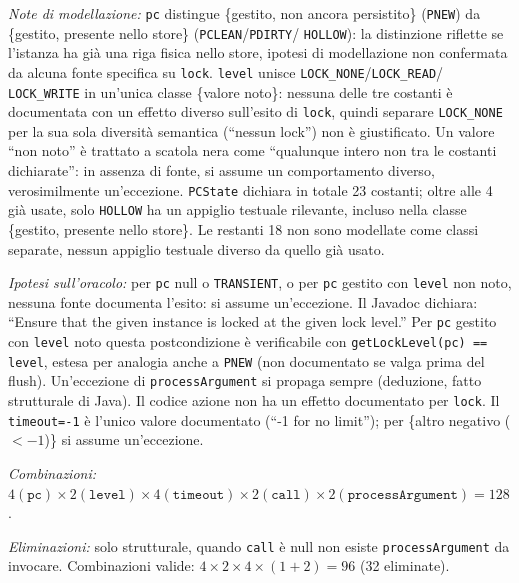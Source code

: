 \textit{Note di modellazione:} \texttt{pc} distingue \{gestito, non ancora persistito\}
(\texttt{PNEW}) da \{gestito, presente nello store\} (\texttt{PCLEAN}/\texttt{PDIRTY}/
\texttt{HOLLOW}): la distinzione riflette se l'istanza ha già una riga fisica nello store,
ipotesi di modellazione non confermata da alcuna fonte specifica su \texttt{lock}.
\texttt{level} unisce \texttt{LOCK\_NONE}/\texttt{LOCK\_READ}/
\texttt{LOCK\_WRITE} in un'unica classe \{valore noto\}: nessuna delle tre costanti è
documentata con un effetto diverso sull'esito di \texttt{lock}, quindi separare
\texttt{LOCK\_NONE} per la sua sola diversità semantica (``nessun lock'') non è giustificato.
Un valore ``non noto'' è trattato a scatola nera come ``qualunque intero non tra le costanti
dichiarate'': in assenza di fonte, si assume un comportamento diverso, verosimilmente
un'eccezione. \texttt{PCState} dichiara in totale 23 costanti; oltre alle 4 già usate, solo
\texttt{HOLLOW} ha un appiglio testuale rilevante, incluso nella classe \{gestito, presente
nello store\}. Le restanti 18 non sono modellate come classi separate, nessun appiglio testuale
diverso da quello già usato.

\textit{Ipotesi sull'oracolo:} per \texttt{pc} null o \texttt{TRANSIENT}, o per \texttt{pc}
gestito con \texttt{level} non noto, nessuna fonte documenta l'esito: si assume un'eccezione.
Il Javadoc dichiara: ``Ensure that the given instance is locked at the given lock level.'' Per
\texttt{pc} gestito con \texttt{level} noto questa postcondizione è verificabile con
\texttt{getLockLevel(pc) == level}, estesa per analogia anche a \texttt{PNEW} (non documentato
se valga prima del flush). Un'eccezione di \texttt{processArgument} si propaga sempre
(deduzione, fatto strutturale di Java). Il codice azione non ha un effetto documentato per
\texttt{lock}. Il \texttt{timeout=-1} è l'unico valore documentato (``-1 for no limit''); per
\{altro negativo ($<-1$)\} si assume un'eccezione.

\textit{Combinazioni:} $4 (\texttt{pc}) \times 2 (\texttt{level}) \times 4 (\texttt{timeout})
\times 2 (\texttt{call}) \times 2 (\texttt{processArgument}) = 128$.

\textit{Eliminazioni:} solo strutturale, quando \texttt{call} è null non esiste
\texttt{processArgument} da invocare. Combinazioni valide:
$4 \times 2 \times 4 \times (1+2) = 96$ (32 eliminate).

